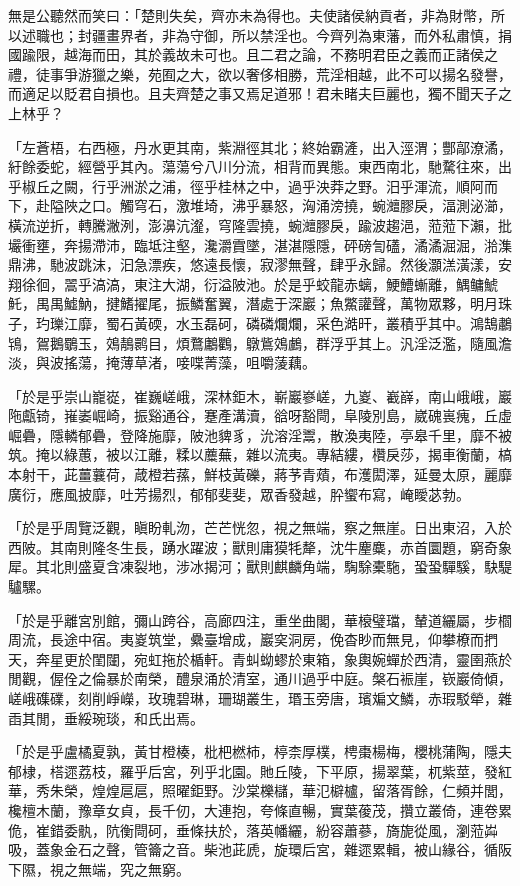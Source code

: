 \begin{pinyinscope}
無是公聽然而笑曰：「楚則失矣，齊亦未為得也。夫使諸侯納貢者，非為財幣，所以述職也；封疆畫界者，非為守御，所以禁淫也。今齊列為東藩，而外私肅慎，捐國踰限，越海而田，其於義故未可也。且二君之論，不務明君臣之義而正諸侯之禮，徒事爭游獵之樂，苑囿之大，欲以奢侈相勝，荒淫相越，此不可以揚名發譽，而適足以貶君自損也。且夫齊楚之事又焉足道邪！君未睹夫巨麗也，獨不聞天子之上林乎？

「左蒼梧，右西極，丹水更其南，紫淵徑其北；終始霸滻，出入涇渭；酆鄗潦潏，紆餘委蛇，經營乎其內。蕩蕩兮八川分流，相背而異態。東西南北，馳騖往來，出乎椒丘之闕，行乎洲淤之浦，徑乎桂林之中，過乎泱莽之野。汨乎渾流，順阿而下，赴隘陜之口。觸穹石，激堆埼，沸乎暴怒，洶涌滂撓，蜿灗膠戾，湢測泌瀄，橫流逆折，轉騰潎洌，澎濞沆瀣，穹隆雲撓，蜿灗膠戾，踰波趨浥，蒞蒞下瀨，批壧衝壅，奔揚滯沛，臨坻注壑，瀺灂霣墜，湛湛隱隱，砰磅訇礚，潏潏淈淈，湁潗鼎沸，馳波跳沫，汩急漂疾，悠遠長懷，寂漻無聲，肆乎永歸。然後灝溔潢漾，安翔徐徊，翯乎滈滈，東注大湖，衍溢陂池。於是乎蛟龍赤螭，鯁鰽螹離，鰅鳙鯱魠，禺禺鱋魶，揵鰭擢尾，振鱗奮翼，潛處于深巖；魚鱉讙聲，萬物眾夥，明月珠子，玓瓅江靡，蜀石黃碝，水玉磊砢，磷磷爛爛，采色澔旰，叢積乎其中。鴻鵠鷫鴇，鴐鵝鸀玉，鵁鶄鹮目，煩鶩鷛鸜，鷻鴜鵁鸕，群浮乎其上。汎淫泛濫，隨風澹淡，與波搖蕩，掩薄草渚，唼喋菁藻，咀嚼蔆藕。

「於是乎崇山巃嵸，崔巍嵯峨，深林鉅木，嶄巖嵾嵯，九嵏、嶻嶭，南山峨峨，巖陁甗锜，嶊崣崛崎，振谿通谷，蹇產溝瀆，谽呀豁閜，阜陵別島，崴磈嵔瘣，丘虛崛礨，隱轔郁礨，登降施靡，陂池貏豸，沇溶淫鬻，散渙夷陸，亭皋千里，靡不被筑。掩以綠蕙，被以江離，糅以蘪蕪，雜以流夷。專結縷，欑戾莎，揭車衡蘭，槁本射干，茈薑蘘荷，葴橙若蓀，鮮枝黃礫，蔣芧青薠，布濩閎澤，延曼太原，麗靡廣衍，應風披靡，吐芳揚烈，郁郁斐斐，眾香發越，肸蠁布寫，崦瞹苾勃。

「於是乎周覽泛觀，瞋盼軋沕，芒芒恍忽，視之無端，察之無崖。日出東沼，入於西陂。其南則隆冬生長，踴水躍波；獸則庸獏牦犛，沈牛麈麋，赤首圜題，窮奇象犀。其北則盛夏含凍裂地，涉冰揭河；獸則麒麟角端，騊駼橐駞，蛩蛩驒騱，駃騠驢騾。

「於是乎離宮別館，彌山跨谷，高廊四注，重坐曲閣，華榱璧璫，輦道纚屬，步櫩周流，長途中宿。夷嵏筑堂，纍臺增成，巖穾洞房，俛杳眇而無見，仰攀橑而捫天，奔星更於閨闥，宛虹拖於楯軒。青虯蚴蟉於東箱，象輿婉蟬於西清，靈圉燕於閒觀，偓佺之倫暴於南榮，醴泉涌於清室，通川過乎中庭。槃石裖崖，嵚巖倚傾，嵯峨磼礏，刻削崢嶸，玫瑰碧琳，珊瑚叢生，瑉玉旁唐，璸斒文鱗，赤瑕駁犖，雜臿其閒，垂綏琬琰，和氏出焉。

「於是乎盧橘夏孰，黃甘橙楱，枇杷橪柿，楟柰厚樸，梬棗楊梅，櫻桃蒲陶，隱夫郁棣，榙遝荔枝，羅乎后宮，列乎北園。貤丘陵，下平原，揚翠葉，杌紫莖，發紅華，秀朱榮，煌煌扈扈，照曜鉅野。沙棠櫟櫧，華氾檘櫨，留落胥餘，仁頻并閭，欃檀木蘭，豫章女貞，長千仞，大連抱，夸條直暢，實葉葰茂，攢立叢倚，連卷累佹，崔錯委骫，阬衡閜砢，垂條扶於，落英幡纚，紛容蕭蔘，旖旎從風，瀏蒞芔吸，蓋象金石之聲，管籥之音。柴池茈虒，旋環后宮，雜遝累輯，被山緣谷，循阪下隰，視之無端，究之無窮。


\end{pinyinscope}
